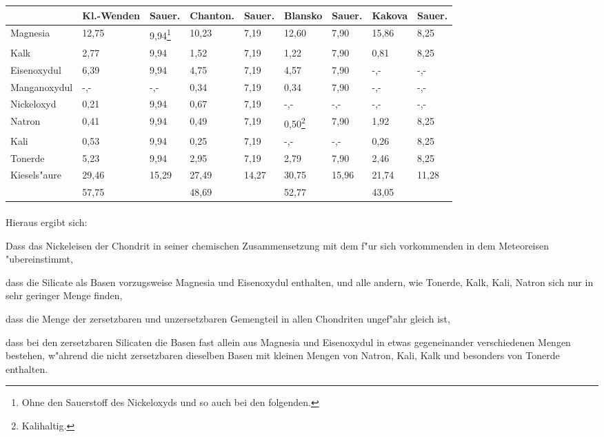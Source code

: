 \documentclass[a4paper, 11pt, oneside, german]{article}
\begin{document}
\begin{center}
\begin{tabular}{ |p{23mm}|p{12mm}|p{9mm}|p{13mm}|p{8mm}|p{11mm}|p{8mm}|p{10mm}|p{8mm}| }
    \hline
     & Kl.-Wenden & Sauer. & Chanton. & Sauer. & Blansko & Sauer. & Kakova & Sauer.\\
    \hline\hline
    Magnesia & 12,75 & 9,94\footnote{Ohne den Sauerstoff des Nickeloxyds und so auch bei den folgenden.} & 10,23 & 7,19 & 12,60 & 7,90 & 15,86 & 8,25\\\hline
    Kalk & 2,77 & 9,94 & 1,52 & 7,19 & 1,22 & 7,90 & 0,81 & 8,25\\\hline
    Eisenoxydul & 6,39 & 9,94 & 4,75 & 7,19 & 4,57 & 7,90 & -,- & -,-\\\hline
    Manganoxydul & -,- & -,- & 0,34 & 7,19 & 0,34 & 7,90 & -,- & -,-\\\hline
    Nickeloxyd & 0,21 & 9,94 & 0,67 & 7,19 & -,- & -,- & -,- & -,-\\\hline
    Natron & 0,41 & 9,94 & 0,49 & 7,19 & 0,50\footnote{Kalihaltig.} & 7,90 & 1,92 & 8,25\\\hline
    Kali & 0,53 & 9,94 & 0,25 & 7,19 & -,- & -,- & 0,26 & 8,25\\\hline
    Tonerde & 5,23 & 9,94 & 2,95 & 7,19 & 2,79 & 7,90 & 2,46 & 8,25\\\hline
    Kiesels"aure & 29,46 & 15,29 & 27,49 & 14,27 & 30,75 & 15,96 & 21,74 & 11,28\\\hline
     & 57,75 & & 48,69 & & 52,77 & & 43,05 & \\
    \hline
\end{tabular}
\end{center}
\vspace{\medskipamount}
\paragraph{}
Hieraus ergibt sich:

Dass das Nickeleisen der Chondrit in seiner chemischen Zusammensetzung mit dem f"ur sich vorkommenden in dem Meteoreisen "ubereinstimmt, 

dass die Silicate als Basen vorzugsweise Magnesia und Eisenoxydul enthalten, und alle andern, wie Tonerde, Kalk, Kali, Natron sich nur in sehr geringer Menge finden,

dass die Menge der zersetzbaren und unzersetzbaren Gemengteil in allen Chondriten ungef"ahr gleich ist,

dass bei den zersetzbaren Silicaten die Basen fast allein aus Magnesia und Eisenoxydul in etwas gegeneinander verschiedenen Mengen bestehen, w"ahrend die nicht zersetzbaren dieselben Basen mit kleinen Mengen von Natron, Kali, Kalk und besonders von Tonerde enthalten.
\end{document}
